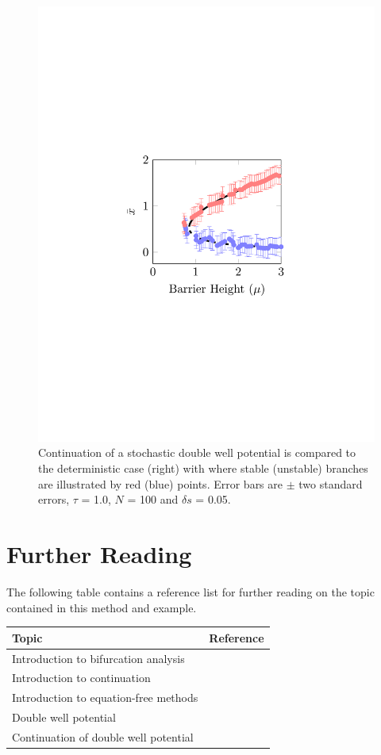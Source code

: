 \documentclass[11pt]{article}
\begin{document}
\begin{figure}[t]
	\centering
	\includegraphics[width=0.5\linewidth, trim=5cm 9cm 5cm 9cm, clip=true]{StochasticDoubleWell}	
	\caption{Continuation of a stochastic double well potential is compared to the deterministic case (right) with where stable (unstable) branches are illustrated by red (blue) points. Error bars are $\pm$ two standard errors, $\tau$ = 1.0, $N$ = 100 and $\delta s$ = 0.05. \label{fig:SDW}}
\end{figure}
 
\section{Further Reading}

The following table contains a reference list for further reading on the topic contained in this method and example. 
\begin{center}
\begin{tabular}{|l|c|}
\hline
Topic									&	Reference \\ \hline
Introduction to bifurcation analysis		&	\cite{Meunier1988}	\\
Introduction to continuation 			&	\cite{Doedel1991,Allgower1990,Rheinboldt2000,Krauskopf2007} \\ 
Introduction to equation-free methods	&	\cite{Theodoropoulos2000,Kevrekidis2003,Kevrekidis2009}	\\
Double well potential 					&	\cite{Mahato1998,Zhu2013,Ditlevsen2010}	\\
Continuation of double well potential	&	\cite{Barkley2006,Kuehn2013}	\\
\hline
\end{tabular}
\end{center}
\end{document}
